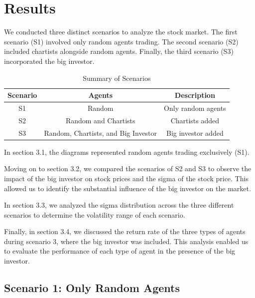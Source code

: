 \documentclass[a4paper, 12pt]{article}
\begin{document}
\section{Results}
We conducted three distinct scenarios to analyze the stock market. The first scenario (S1) involved only random agents trading. The second scenario (S2) included chartists alongside random agents. Finally, the third scenario (S3) incorporated the big investor.\par

\begin{table}[h!]
\centering
\caption{Summary of Scenarios}
\label{tab:scenarios}
\begin{tabular}{@{}ccc@{}}
\toprule
\textbf{Scenario} & \textbf{Agents} & \textbf{Description} \\ \midrule
S1 & Random & Only random agents \\
S2 & Random and Chartists & Chartists added \\
S3 & Random, Chartists, and Big Investor & Big investor added \\ \bottomrule
\end{tabular}
\end{table}

In section 3.1, the diagrams represented random agents trading exclusively (S1).

Moving on to section 3.2, we compared the scenarios of S2 and S3 to observe the impact of the big investor on stock prices and the sigma of the stock price. This allowed us to identify the substantial influence of the big investor on the market.

In section 3.3, we analyzed the sigma distribution across the three different scenarios to determine the volatility range of each scenario.

Finally, in section 3.4, we discussed the return rate of the three types of agents during scenario 3, where the big investor was included. This analysis enabled us to evaluate the performance of each type of agent in the presence of the big investor.\par

\subsection{Scenario 1: Only Random Agents}
\end{document}
